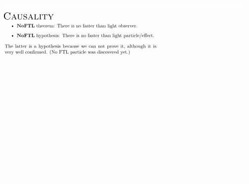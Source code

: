 \documentclass[xcolor=x11names]{beamer}
\begin{document}
\begin{frame}[fragile]
\vspace{-.55cm}
\[
\hspace{-1cm}
\begin{tikzpicture}[>=stealth, scale=1,
world/.style={inner sep=0, minimum size=.15cm, fill=black, circle},
worldline/.style={line width=1mm, rounded corners=1pt, opacity=.5},
axis/.style={->},
light/.style={orange, line width=.5mm},
]
\pgfmathdeclarefunction{XLorentz}{3}{\pgfmathparse{(#2 - #1*#3)/(sqrt(1-(#1)^2))}} %
\pgfmathdeclarefunction{YLorentz}{3}{\pgfmathparse{(#3 - #1*#2)/(sqrt(1-(#1)^2))}} %


\node[anchor=north west, inner sep=0] at (0.5,8.5) {\textsc{\Large Causality}}; %
\draw[white]  %
      (0,0) rectangle (12.77,8.9);
\node[anchor=north west, scale=.7] at (0.5,8) {\begin{minipage}{11cm}
\begin{itemize}
\item \textbf{NoFTL} theorem: There is no faster than light observer.
\item \textbf{NoFTL} hypothesis: There is no faster than light particle/effect.
\end{itemize}
The latter is a hypothesis because we can not prove it, although it is very well confirmed. (No FTL particle was discovered yet.)
\end{minipage}
};


\coordinate (SignalStart) at (9,5) {} {} {} {} {};
\coordinate (SignalBounced) at (12,8) {} {} {} {};
\coordinate (AliceStart) at (10.5,5) {} {} {} {};
\coordinate (AliceEnd) at (10.5,8) {} {} {} {};
\coordinate (BobStart) at (10,5) {} {} {} {} {} {} {}; %
\coordinate (BobEnd) at (11,8) {} {} {} {} {} {} {};
\coordinate (CecileStart) at (9.5,5) {} {} {} {} {} {} {} {}; %
\coordinate (CecileEnd) at (11.5,8) {} {} {} {} {} {} {} {};
\coordinate(FTLStart) at (9,6.5) {} {};
\coordinate(FTLEnd) at (12,7.5) {} {};


\end{tikzpicture}\]
\end{frame}
\end{document}
